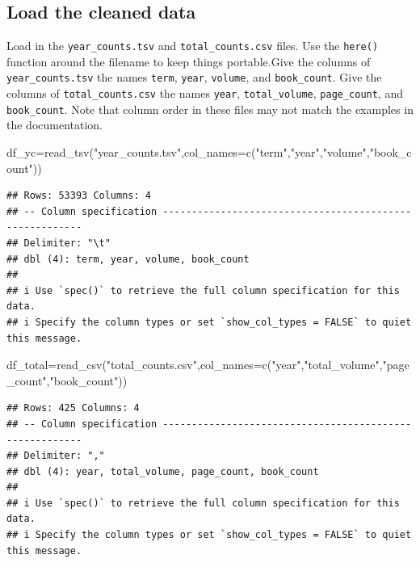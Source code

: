 \documentclass[
]{article}
\newenvironment{Shaded}{\begin{snugshade}}{\end{snugshade}}
\newcommand{\AttributeTok}[1]{\textcolor[rgb]{0.77,0.63,0.00}{#1}}
\newcommand{\FunctionTok}[1]{\textcolor[rgb]{0.00,0.00,0.00}{#1}}
\newcommand{\NormalTok}[1]{#1}
\newcommand{\OtherTok}[1]{\textcolor[rgb]{0.56,0.35,0.01}{#1}}
\newcommand{\StringTok}[1]{\textcolor[rgb]{0.31,0.60,0.02}{#1}}
\begin{document}
\hypertarget{load-the-cleaned-data}{%
\subsection{Load the cleaned data}\label{load-the-cleaned-data}}

Load in the \texttt{year\_counts.tsv} and \texttt{total\_counts.csv}
files. Use the \texttt{here()} function around the filename to keep
things portable.Give the columns of \texttt{year\_counts.tsv} the names
\texttt{term}, \texttt{year}, \texttt{volume}, and \texttt{book\_count}.
Give the columns of \texttt{total\_counts.csv} the names \texttt{year},
\texttt{total\_volume}, \texttt{page\_count}, and \texttt{book\_count}.
Note that column order in these files may not match the examples in the
documentation.

\begin{Shaded}
\begin{Highlighting}[]
\NormalTok{df\_yc}\OtherTok{=}\FunctionTok{read\_tsv}\NormalTok{(}\StringTok{"year\_counts.tsv"}\NormalTok{,}\AttributeTok{col\_names=}\FunctionTok{c}\NormalTok{(}\StringTok{"term"}\NormalTok{,}\StringTok{"year"}\NormalTok{,}\StringTok{"volume"}\NormalTok{,}\StringTok{"book\_count"}\NormalTok{))}
\end{Highlighting}
\end{Shaded}

\begin{verbatim}
## Rows: 53393 Columns: 4
## -- Column specification --------------------------------------------------------
## Delimiter: "\t"
## dbl (4): term, year, volume, book_count
## 
## i Use `spec()` to retrieve the full column specification for this data.
## i Specify the column types or set `show_col_types = FALSE` to quiet this message.
\end{verbatim}

\begin{Shaded}
\begin{Highlighting}[]
\NormalTok{df\_total}\OtherTok{=}\FunctionTok{read\_csv}\NormalTok{(}\StringTok{"total\_counts.csv"}\NormalTok{,}\AttributeTok{col\_names=}\FunctionTok{c}\NormalTok{(}\StringTok{"year"}\NormalTok{,}\StringTok{"total\_volume"}\NormalTok{,}\StringTok{"page\_count"}\NormalTok{,}\StringTok{"book\_count"}\NormalTok{))}
\end{Highlighting}
\end{Shaded}

\begin{verbatim}
## Rows: 425 Columns: 4
## -- Column specification --------------------------------------------------------
## Delimiter: ","
## dbl (4): year, total_volume, page_count, book_count
## 
## i Use `spec()` to retrieve the full column specification for this data.
## i Specify the column types or set `show_col_types = FALSE` to quiet this message.
\end{verbatim}
\end{document}
